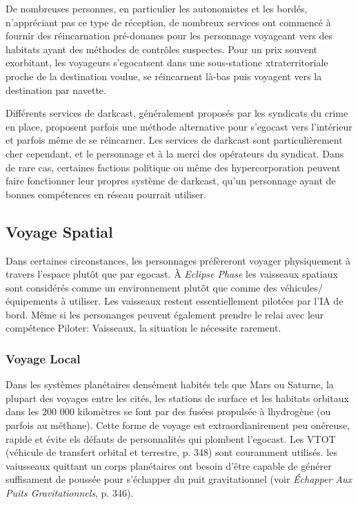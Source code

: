 De nombreuses personnes, en particulier les autonomistes et les bordés, n'appréciant pas ce type de réception, de nombreux services ont commencé à fournir des réincarnation pré-douanes pour les personnage voyageant vers des habitats ayant des méthodes de contrôles suspectes. Pour un prix souvent exorbitant, les voyageurs s'egocatsent dans une sous-statione xtraterritoriale proche de la destination voulue, se réincarnent là-bas puis voyagent vers la destination par navette. 

Différents services de darkcast, généralement proposés par les syndicats du crime en place, proposent parfois une méthode alternative pour s'egocast vers l'intérieur et parfois même de se réincarner. Les services de darkcast sont particulièrement cher cependant, et le personnage et à la merci des opérateurs du syndicat. Dans de rare cas, certaines factions politique ou même des hypercorporation peuvent faire fonctionner leur propres système de darkcast, qu'un personnage ayant de bonnes compétences en réseau pourrait utiliser. 

\subsection{Voyage Spatial} 

Dans certaines circonstances, les personnages préfèreront voyager physiquement à travers l'espace plutôt que par egocast. À \textit{Eclipse Phase} les vaisseaux spatiaux sont considérés comme un environnement plutôt que comme des véhicules/équipements à utiliser. Les vaisseaux restent essentiellement pilotées par l'IA de bord. Même si les personanges peuvent également prendre le relai avec leur compétence Piloter: Vaisseaux, la situation le nécessite rarement. 

\subsubsection{Voyage Local} 

Dans les systèmes planétaires densément habités tels que Mars ou Saturne, la plupart des voyages entre les cités, les stations de surface et les habitats orbitaux dans les 200 000 kilomètres se font par des fusées propulsée à lhydrogène (ou parfois au méthane). Cette forme de voyage est extraordianirement peu onéreuse, rapide et évite els défauts de personnalités qui plombent l'egocast. Les VTOT (véhicule de transfert orbital et terrestre, p. 348) sont couramment utilisés. les vaiusseaux quittant un corps planétaires ont besoin d'être capable de générer suffisament de poussée pour s'échapper du puit gravitationnel (voir \textit{Échapper Aux Puits Gravitationnels}, p. 346). 

